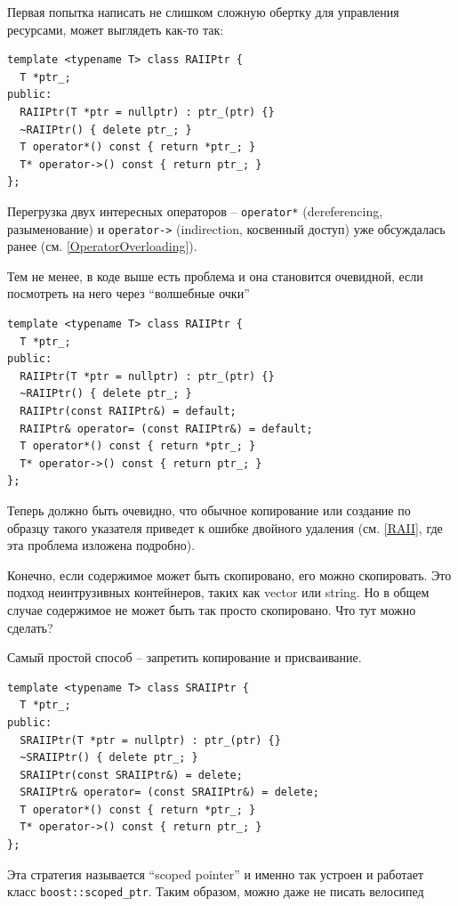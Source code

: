 \documentclass[a4paper,12pt,oneside]{article}
\begin{document}
Первая попытка написать не слишком сложную обертку для управления ресурсами, может выглядеть как-то так:

\begin{lstlisting}
template <typename T> class RAIIPtr {
  T *ptr_;
public:
  RAIIPtr(T *ptr = nullptr) : ptr_(ptr) {}
  ~RAIIPtr() { delete ptr_; }
  T operator*() const { return *ptr_; }
  T* operator->() const { return ptr_; }
};
\end{lstlisting}

Перегрузка двух интересных операторов -- \lstinline!operator*! (dereferencing, разыменование) и \lstinline!operator->! (indirection, косвенный доступ) уже обсуждалась ранее (см. \ref{OperatorOverloading}).

Тем не менее, в коде выше есть проблема и она становится очевидной, если посмотреть на него через ``волшебные очки''

\begin{lstlisting}
template <typename T> class RAIIPtr {
  T *ptr_;
public:
  RAIIPtr(T *ptr = nullptr) : ptr_(ptr) {}
  ~RAIIPtr() { delete ptr_; }
  RAIIPtr(const RAIIPtr&) = default;
  RAIIPtr& operator= (const RAIIPtr&) = default;
  T operator*() const { return *ptr_; }
  T* operator->() const { return ptr_; }
};
\end{lstlisting}

Теперь должно быть очевидно, что обычное копирование или создание по образцу такого указателя приведет к ошибке двойного удаления (см. \ref{RAII}, где эта проблема изложена подробно). 

Конечно, если содержимое может быть скопировано, его можно скопировать. Это подход неинтрузивных контейнеров, таких как vector или string. Но в общем случае содержимое не может быть так просто скопировано. Что тут можно сделать? 

Самый простой способ -- запретить копирование и присваивание. 

\begin{lstlisting}
template <typename T> class SRAIIPtr {
  T *ptr_;
public:
  SRAIIPtr(T *ptr = nullptr) : ptr_(ptr) {}
  ~SRAIIPtr() { delete ptr_; }
  SRAIIPtr(const SRAIIPtr&) = delete;
  SRAIIPtr& operator= (const SRAIIPtr&) = delete;
  T operator*() const { return *ptr_; }
  T* operator->() const { return ptr_; }
};
\end{lstlisting}

Эта стратегия называется ``scoped pointer'' и именно так устроен и работает класс \lstinline!boost::scoped_ptr!. Таким образом, можно даже не писать велосипед
\end{document}
